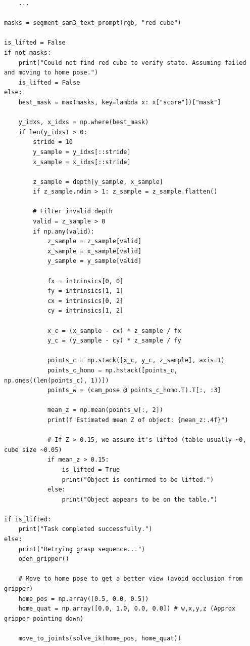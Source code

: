 \begin{lstlisting}
    ...
    
masks = segment_sam3_text_prompt(rgb, "red cube")

is_lifted = False
if not masks:
    print("Could not find red cube to verify state. Assuming failed and moving to home pose.")
    is_lifted = False
else:
    best_mask = max(masks, key=lambda x: x["score"])["mask"]
    
    y_idxs, x_idxs = np.where(best_mask)
    if len(y_idxs) > 0:
        stride = 10
        y_sample = y_idxs[::stride]
        x_sample = x_idxs[::stride]
        
        z_sample = depth[y_sample, x_sample]
        if z_sample.ndim > 1: z_sample = z_sample.flatten()
        
        # Filter invalid depth
        valid = z_sample > 0
        if np.any(valid):
            z_sample = z_sample[valid]
            x_sample = x_sample[valid]
            y_sample = y_sample[valid]
            
            fx = intrinsics[0, 0]
            fy = intrinsics[1, 1]
            cx = intrinsics[0, 2]
            cy = intrinsics[1, 2]
            
            x_c = (x_sample - cx) * z_sample / fx
            y_c = (y_sample - cy) * z_sample / fy
            
            points_c = np.stack([x_c, y_c, z_sample], axis=1)
            points_c_homo = np.hstack([points_c, np.ones((len(points_c), 1))])
            points_w = (cam_pose @ points_c_homo.T).T[:, :3]
            
            mean_z = np.mean(points_w[:, 2])
            print(f"Estimated mean Z of object: {mean_z:.4f}")
            
            # If Z > 0.15, we assume it's lifted (table usually ~0, cube size ~0.05)
            if mean_z > 0.15:
                is_lifted = True
                print("Object is confirmed to be lifted.")
            else:
                print("Object appears to be on the table.")

if is_lifted:
    print("Task completed successfully.")
else:
    print("Retrying grasp sequence...")
    open_gripper()
    
    # Move to home pose to get a better view (avoid occlusion from gripper)
    home_pos = np.array([0.5, 0.0, 0.5]) 
    home_quat = np.array([0.0, 1.0, 0.0, 0.0]) # w,x,y,z (Approx gripper pointing down)
    
    move_to_joints(solve_ik(home_pos, home_quat))
    

\end{lstlisting}
